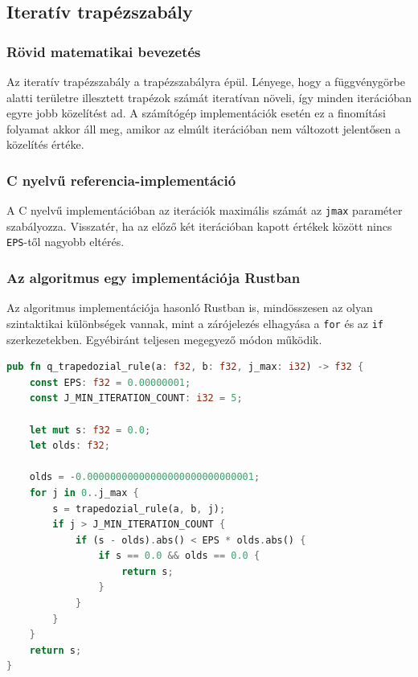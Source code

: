 \subsection{Iteratív trapézszabály}

\subsubsection{Rövid matematikai bevezetés}

Az iteratív trapézszabály a trapézszabályra épül. Lényege, hogy a függvénygörbe alatti területre illesztett trapézok számát iteratívan növeli, így minden iterációban egyre jobb közelítést ad. A számítógép implementációk esetén ez a finomítási folyamat akkor áll meg, amikor az elmúlt iterációban nem változott jelentősen a közelítés értéke.

\subsubsection{C nyelvű referencia-implementáció}
A C nyelvű implementációban az iterációk maximális számát az \lstinline{jmax} paraméter szabályozza. Visszatér, ha az előző két iterációban kapott értékek között nincs \lstinline{EPS}-től nagyobb eltérés.
\subsubsection{Az algoritmus egy implementációja Rustban}
Az algoritmus implementációja hasonló Rustban is, mindösszesen az olyan szintaktikai különbségek vannak, mint a zárójelezés elhagyása a \lstinline{for} és az \lstinline{if} szerkezetekben. Egyébiránt teljesen megegyező módon működik.
\begin{lstlisting}[language=Rust]
pub fn q_trapedozial_rule(a: f32, b: f32, j_max: i32) -> f32 {
    const EPS: f32 = 0.00000001;
    const J_MIN_ITERATION_COUNT: i32 = 5;

    let mut s: f32 = 0.0;
    let olds: f32;

    olds = -0.00000000000000000000000000001;
    for j in 0..j_max {
        s = trapedozial_rule(a, b, j);
        if j > J_MIN_ITERATION_COUNT {
            if (s - olds).abs() < EPS * olds.abs() {
                if s == 0.0 && olds == 0.0 {
                    return s;
                }
            }
        }
    }
    return s;
}
\end{lstlisting}

